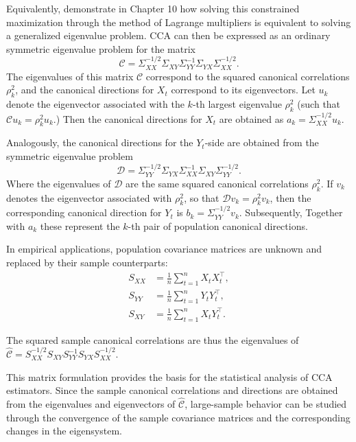 \documentclass[12pt]{report} %
\begin{document}
Equivalently, \cite[pp.~539--574]{johnson2007applied} demonstrate
in Chapter 10 how solving this constrained maximization through the method of Lagrange multipliers 
is equivalent to solving a generalized eigenvalue problem. 
CCA can then be expressed as an ordinary symmetric eigenvalue problem for the matrix 
\begin{equation}
\mathcal{C} 
= \Sigma_{XX}^{-1/2} \Sigma_{XY} 
\Sigma_{YY}^{-1} 
\Sigma_{YX} \Sigma_{XX}^{-1/2}.
\end{equation}
The eigenvalues of this matrix $\mathcal{C}$ correspond to the squared canonical correlations 
$\rho_k^2$, and the canonical directions for $X_t$ correspond to its eigenvectors. 
Let $u_k$ denote the eigenvector associated with the $k$-th largest eigenvalue $\rho_k^2$ 
(such that $\mathcal{C} u_k = \rho_k^2 u_k$.) Then the canonical directions for $X_t$ are 
obtained as $a_k = \Sigma_{XX}^{-1/2} u_k$.

Analogously, the canonical directions for the \(Y_t\)-side are obtained from the
symmetric eigenvalue problem
\begin{equation}
\mathcal{D}
=
\Sigma_{YY}^{-1/2}
\Sigma_{YX}
\Sigma_{XX}^{-1}
\Sigma_{XY}
\Sigma_{YY}^{-1/2}.
\end{equation}
Where the eigenvalues of \(\mathcal{D}\) are the same squared canonical
correlations \(\rho_k^2\). If \(v_k\) denotes the eigenvector associated with
\(\rho_k^2\), so that $\mathcal{D}v_k = \rho_k^2 v_k$, then the corresponding canonical direction for \(Y_t\) is
$b_k = \Sigma_{YY}^{-1/2}v_k$. Subsequently, Together with $a_k$ these represent
the \(k\)-th pair of population canonical directions.

In empirical applications, population covariance matrices are unknown and replaced by their 
sample counterparts:
\begin{align}
S_{XX} &= \frac{1}{n} \sum_{t=1}^n X_t X_t^\top, \\
S_{YY} &= \frac{1}{n} \sum_{t=1}^n Y_t Y_t^\top, \\
S_{XY} &= \frac{1}{n} \sum_{t=1}^n X_t Y_t^\top.
\end{align}

The squared sample canonical correlations are thus the eigenvalues of 
$\widehat{\mathcal{C}} 
= S_{XX}^{-1/2} S_{XY} 
S_{YY}^{-1} 
S_{YX} S_{XX}^{-1/2}$.

This matrix formulation provides the basis for the statistical analysis of CCA estimators. 
Since the sample canonical correlations and directions are obtained from the eigenvalues and 
eigenvectors of $\widehat{\mathcal{C}}$, 
large-sample behavior can be studied through the convergence of the sample covariance matrices 
and the corresponding changes in the eigensystem.
\end{document}

